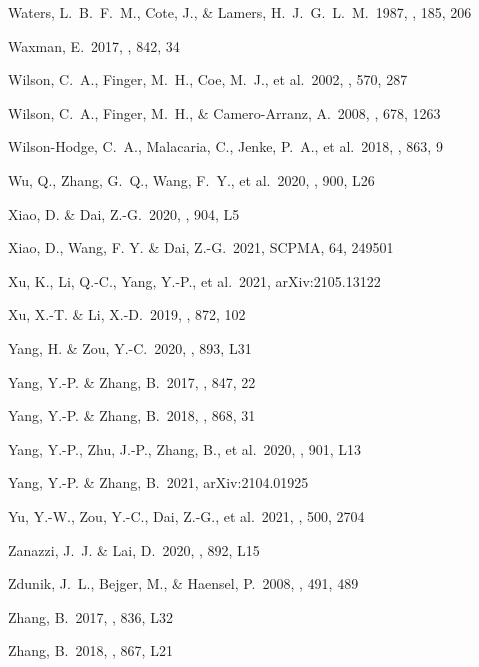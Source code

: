 \documentclass[twocolumn]{aastex62}
\begin{document}
\begin{thebibliography}
 Waters, L.~B.~F.~M., Cote, J., \& Lamers, H.~J.~G.~L.~M.\ 1987, \aap, 185, 206

 Waxman, E.\ 2017, \apj, 842, 34

 Wilson, C.~A., Finger, M.~H., Coe, M.~J., et al.\ 2002, \apj, 570, 287

 Wilson, C.~A., Finger, M.~H., \& Camero-Arranz, A.\ 2008, \apj, 678, 1263

 Wilson-Hodge, C.~A., Malacaria, C., Jenke, P.~A., et al.\ 2018, \apj, 863, 9

 Wu, Q., Zhang, G.~Q., Wang, F.~Y., et al.\ 2020, \apjl, 900, L26

 Xiao, D. \& Dai, Z.-G.\ 2020, \apjl, 904, L5

 Xiao, D., Wang, F. Y. \& Dai, Z.-G.\ 2021, SCPMA, 64, 249501

 Xu, K., Li, Q.-C., Yang, Y.-P., et al.\ 2021, arXiv:2105.13122

 Xu, X.-T. \& Li, X.-D.\ 2019, \apj, 872, 102

 Yang, H. \& Zou, Y.-C.\ 2020, \apjl, 893, L31

 Yang, Y.-P. \& Zhang, B.\ 2017, \apj, 847, 22

 Yang, Y.-P. \& Zhang, B.\ 2018, \apj, 868, 31

 Yang, Y.-P., Zhu, J.-P., Zhang, B., et al.\ 2020, \apjl, 901, L13

 Yang, Y.-P. \& Zhang, B.\ 2021, arXiv:2104.01925

 Yu, Y.-W., Zou, Y.-C., Dai, Z.-G., et al.\ 2021, \mnras, 500, 2704

 Zanazzi, J.~J. \& Lai, D.\ 2020, \apjl, 892, L15

 Zdunik, J.~L., Bejger, M., \& Haensel, P.\ 2008, \aap, 491, 489

 Zhang, B.\ 2017, \apjl, 836, L32

 Zhang, B.\ 2018, \apjl, 867, L21


\end{thebibliography}
\end{document}
